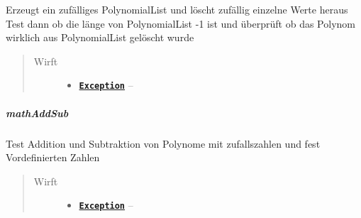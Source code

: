 \documentclass[letterpaper,10pt,ngerman]{sphinxmanual}
\begin{document}
\begin{fulllineitems}
\label{com/linuxluigi/polynomial/test/PolynomialListTest:com.linuxluigi.polynomial.test.PolynomialListTest.delte()}
Erzeugt ein zufälliges PolynomialList und löscht zufällig einzelne Werte heraus Test dann ob die länge von PolynomialList -1 ist und überprüft ob das Polynom wirklich aus PolynomialList gelöscht wurde
\begin{quote}\begin{description}
\item[{Wirft}] \leavevmode\begin{itemize}
\item {} 
\href{http://docs.oracle.com/javase/8/docs/api/java/lang/Exception.html}{\textbf{\texttt{Exception}}} -- 

\end{itemize}

\end{description}\end{quote}

\end{fulllineitems}



\subparagraph{mathAddSub}
\label{com/linuxluigi/polynomial/test/PolynomialListTest:mathaddsub}

\begin{fulllineitems}
\label{com/linuxluigi/polynomial/test/PolynomialListTest:com.linuxluigi.polynomial.test.PolynomialListTest.mathAddSub()}
Test Addition und Subtraktion von Polynome mit zufallszahlen und fest Vordefinierten Zahlen
\begin{quote}\begin{description}
\item[{Wirft}] \leavevmode\begin{itemize}
\item {} 
\href{http://docs.oracle.com/javase/8/docs/api/java/lang/Exception.html}{\textbf{\texttt{Exception}}} -- 

\end{itemize}

\end{description}\end{quote}

\end{fulllineitems}
\end{document}
